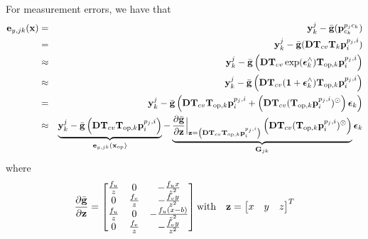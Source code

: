 \documentclass[a4paper]{article}
\begin{document}
For measurement errors, we have that
\begin{eqnarray}
    \bm{\mathbf{e}}_{y, jk}(\bm{\mathbf{x}}) 
    &=& \bm{\mathbf{y}}^j_k - \bar{\bm{\mathbf{g}}}(\bm{\mathbf{p}}_{c_k}^{p_j c_k})\\
    &=& \bm{\mathbf{y}}^j_k - \bar{\bm{\mathbf{g}}}(\bm{\mathbf{D}} \bm{\mathbf{T}}_{cv} \bm{\mathbf{T}}_{k}\bm{\mathbf{p}}_i^{p_j, i})\\
    &\approx& \bm{\mathbf{y}}^j_k - \bar{\bm{\mathbf{g}}}\left(\bm{\mathbf{D}} \bm{\mathbf{T}}_{cv}  \exp(\bm{\mathbf{\epsilon}}_k^\wedge) \bm{\mathbf{T}}_{\text{op}, k}\bm{\mathbf{p}}_i^{p_j, i}  \right)\\
    &\approx& \bm{\mathbf{y}}^j_k - \bar{\bm{\mathbf{g}}}\left(  \bm{\mathbf{D}} \bm{\mathbf{T}}_{cv}  (\bm{\mathbf{1}} + \bm{\mathbf{\epsilon}}_k^\wedge) \bm{\mathbf{T}}_{\text{op}, k}\bm{\mathbf{p}}_i^{p_j, i}  \right)\\    
    &=& \bm{\mathbf{y}}^j_k - \bar{\bm{\mathbf{g}}}\left(  \bm{\mathbf{D}} \bm{\mathbf{T}}_{cv} \bm{\mathbf{T}}_{\text{op}, k}\bm{\mathbf{p}}_i^{p_j, i} + \left( \bm{\mathbf{D}} \bm{\mathbf{T}}_{cv} (\bm{\mathbf{T}}_{\text{op}, k}\bm{\mathbf{p}}_i^{p_j, i})^{\odot}  \right) \bm{\mathbf{\epsilon}}_k \right)\\    
    &\approx& \underbrace{\bm{\mathbf{y}}^j_k - \bar{\bm{\mathbf{g}}}\left(  \bm{\mathbf{D}} \bm{\mathbf{T}}_{cv} \bm{\mathbf{T}}_{\text{op}, k}\bm{\mathbf{p}}_i^{p_j, i}\right)}_{\bm{\mathbf{e}}_{y, jk}(\bm{\mathbf{x}}_{\text{op}})}- \underbrace{\dfrac{\partial \bar{\bm{\mathbf{g}}}}{\partial \bm{\mathbf{z}}}\Big|_{\bm{\mathbf{z}}=\left(\bm{\mathbf{D}} \bm{\mathbf{T}}_{cv} \bm{\mathbf{T}}_{\text{op}, k}\bm{\mathbf{p}}_i^{p_j, i}\right)} \left( \bm{\mathbf{D}} \bm{\mathbf{T}}_{cv} (\bm{\mathbf{T}}_{\text{op}, k}\bm{\mathbf{p}}_i^{p_j, i})^{\odot}  \right)}_{\bm{\mathbf{G}}_{jk}} \bm{\mathbf{\epsilon}}_k 
\end{eqnarray}
where
\begin{eqnarray}
    \dfrac{\partial \bar{\bm{\mathbf{g}}}}{\partial \bm{\mathbf{z}}} = \begin{bmatrix}
      \frac{f_u}{z} & 0 & - \frac{f_u x}{z^2}\\
      0 & \frac{f_v}{z} & - \frac{f_v y}{z^2}\\
      \frac{f_u}{z} & 0 & - \frac{f_u (x-b)}{z^2}\\
      0 & \frac{f_v}{z} & - \frac{f_v y}{z^2}\\
    \end{bmatrix}
    \text{with} \quad \bm{\mathbf{z}} = \begin{bmatrix}
      x & y & z
    \end{bmatrix}^T
\end{eqnarray}
\end{document}
